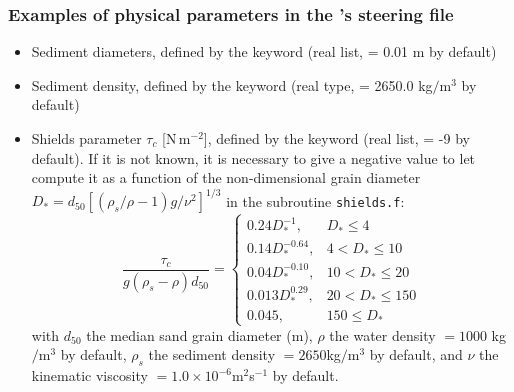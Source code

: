 \subsubsection{Examples of physical parameters in the \gaia{}'s steering file}
\begin{itemize}
\item Sediment diameters, defined by the keyword  (real list, {\ttfamily = 0.01} m by default)
\item Sediment density, defined by the keyword  (real type, {\ttfamily = 2650.0} kg$/$m$^3$ by default)
\item Shields parameter $\tau_c$ [N\,m$^{-2}$], defined by the keyword  (real list, = -9 by default). If it is not known, it is necessary to give a negative value to let \gaia{} compute it as a function of the non-dimensional grain diameter $D_*=d_{50}[(\rho_s/\rho-1)g/\nu^2]^{1/3}$ in the subroutine \texttt{shields.f}:
\begin{equation*}
\frac{\tau_c}{g(\rho_s -\rho)d_{50}}=\left\{\begin{array}{ll}
0.24 D_*^{-1}, & D_* \leq 4 \\
0.14 D_*^{-0.64}, & 4 < D_* \leq 10 \\
 0.04 D_*^{-0.10}, & 10 < D_* \leq 20\\
0.013 D_*^{0.29}, & 20 < D_* \leq 150 \\
0.045, & 150 \leq D_*
\end{array}
\right.
\end{equation*}
with $d_{50}$ the median sand grain diameter (m), $\rho$ the water density $=1000$ kg$/$m$^3$ by default, $\rho_s$ the sediment density $=2650$kg$/$m$^3$ by default, and $\nu$ the kinematic viscosity $=1.0\times 10^{-6}$m$^2$s$^{-1}$ by default.


\end{itemize}
